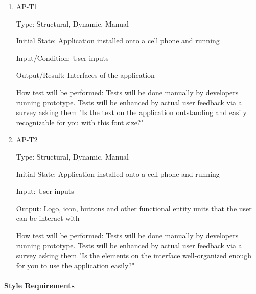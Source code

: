 \documentclass[12pt, titlepage]{article}
\begin{document}
\begin{enumerate}

\item{AP-T1\\}

Type: Structural, Dynamic, Manual
					
Initial State: Application installed onto a cell phone and running
					
Input/Condition: User inputs
					
Output/Result: Interfaces of the application
					
How test will be performed: Tests will be done manually by developers running prototype. Tests will be enhanced by actual user feedback via a survey asking them "Is the text on the application outstanding and easily recognizable for you with this font size?"
					
\item{AP-T2\\}

Type: Structural, Dynamic, Manual
					
Initial State: Application installed onto a cell phone and running
					
Input: User inputs
					
Output: Logo, icon, buttons and other functional entity units that the user can be interact with
					
How test will be performed: Tests will be done manually by developers running prototype. Tests will be enhanced by actual user feedback via a survey asking them "Is the elements on the interface well-organized enough for you to use the application easily?"

\end{enumerate}

\paragraph{Style Requirements}
\end{document}
